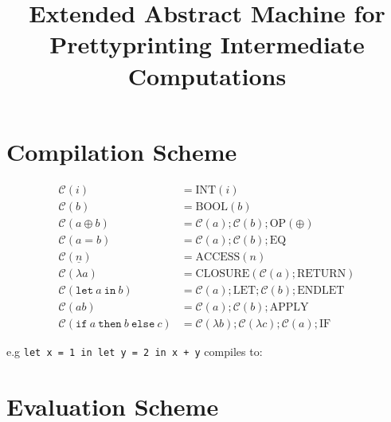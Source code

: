 \documentclass[11pt]{article}
\begin{document}
\title{Extended Abstract Machine for Prettyprinting Intermediate Computations}
\maketitle

\section{Compilation Scheme}

\begin{align*}
\mathcal{C}(i) &= \text{INT}(i)\\
\mathcal{C}(b) &= \text{BOOL}(b)\\
\mathcal{C}(a \oplus b) &= \mathcal{C}(a); \mathcal{C}(b); \text{OP}(\oplus)\\
\mathcal{C}(a = b) &= \mathcal{C}(a); \mathcal{C}(b); \text{EQ}\\
\mathcal{C}(\underline{n}) &= \text{ACCESS}(n)\\
\mathcal{C}(\lambda a) &= \text{CLOSURE}(\mathcal{C}(a); \text{RETURN})\\
\mathcal{C}(\texttt{let}\ a\ \texttt{in}\ b) &= \mathcal{C}(a); \text{LET}; \mathcal{C}(b); \text{ENDLET}\\
\mathcal{C}(a b) &= \mathcal{C}(a); \mathcal{C}(b); \text{APPLY}\\
\mathcal{C}(\texttt{if}\ a\ \texttt{then}\ b\ \texttt{else}\ c) &= \mathcal{C}(\lambda b); \mathcal{C}(\lambda c); \mathcal{C}(a); \text{IF}
\end{align*}

e.g \texttt{let x = 1 in let y = 2 in x + y} compiles to:



\section{Evaluation Scheme}
\end{document}
